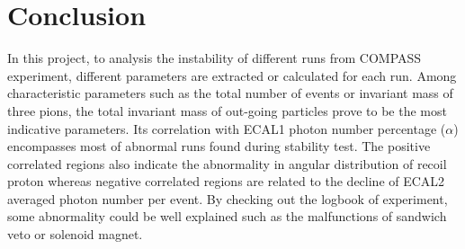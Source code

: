 \section{Conclusion}
In this project, to analysis the instability of different runs from COMPASS experiment, different parameters are extracted or calculated for each run. Among characteristic parameters such as the total number of events or invariant mass of three pions, the total invariant mass of out-going particles prove to be the most indicative parameters. Its correlation with ECAL1 photon number percentage ($\alpha$) encompasses most of abnormal runs found during stability test. The positive correlated regions also indicate the abnormality in angular distribution of recoil proton whereas negative correlated regions are related to the decline of ECAL2 averaged photon number per event. By checking out the logbook of experiment, some abnormality could be well explained such as the malfunctions of sandwich veto or solenoid magnet.